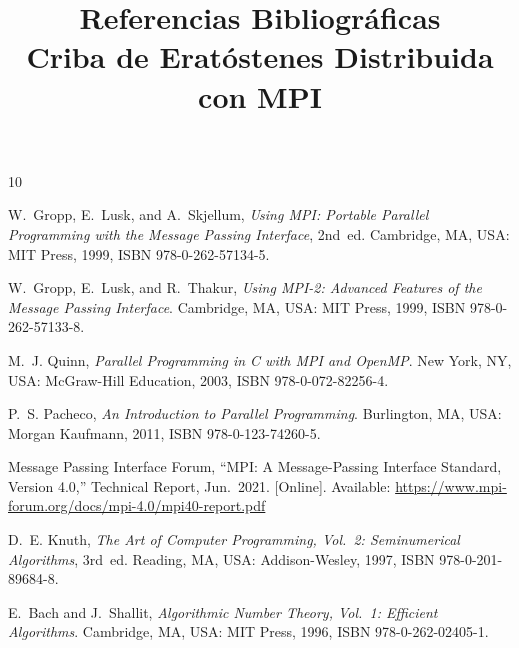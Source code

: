\documentclass[12pt]{article}
\title{Referencias Bibliográficas\\
       \large Criba de Eratóstenes Distribuida con MPI}
\author{}
\date{}
\begin{document}
\maketitle
\thispagestyle{empty}


\begin{thebibliography}{10}


W.~Gropp, E.~Lusk, and A.~Skjellum,
\textit{Using MPI: Portable Parallel Programming with the Message Passing
Interface}, 2nd~ed.
Cambridge, MA, USA: MIT Press, 1999, ISBN 978-0-262-57134-5.

W.~Gropp, E.~Lusk, and R.~Thakur,
\textit{Using MPI-2: Advanced Features of the Message Passing Interface}.
Cambridge, MA, USA: MIT Press, 1999, ISBN 978-0-262-57133-8.

M.~J. Quinn,
\textit{Parallel Programming in C with MPI and OpenMP}.
New York, NY, USA: McGraw-Hill Education, 2003, ISBN 978-0-072-82256-4.

P.~S. Pacheco,
\textit{An Introduction to Parallel Programming}.
Burlington, MA, USA: Morgan Kaufmann, 2011, ISBN 978-0-123-74260-5.


Message Passing Interface Forum,
``MPI: A Message-Passing Interface Standard, Version 4.0,''
Technical Report, Jun.~2021.
[Online]. Available: \url{https://www.mpi-forum.org/docs/mpi-4.0/mpi40-report.pdf}


D.~E. Knuth,
\textit{The Art of Computer Programming, Vol.~2: Seminumerical Algorithms},
3rd~ed.
Reading, MA, USA: Addison-Wesley, 1997, ISBN 978-0-201-89684-8.

E.~Bach and J.~Shallit,
\textit{Algorithmic Number Theory, Vol.~1: Efficient Algorithms}.
Cambridge, MA, USA: MIT Press, 1996, ISBN 978-0-262-02405-1.


\end{thebibliography}
\end{document}
